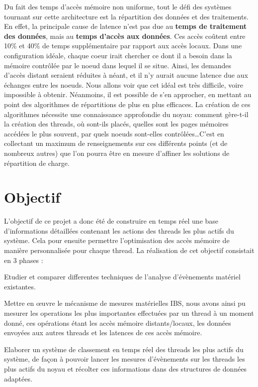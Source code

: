     Du fait des temps d'accès mémoire non uniforme, tout le défi des systèmes
    tournant sur cette architecture est la répartition des données et des
    traitements. En effet, la principale cause de latence n'est pas due au
    \textbf{temps de traitement des données}, mais au \textbf{temps d'accès aux
      données}. Ces accès coûtent entre 10\% et 40\% de temps supplémentaire par
    rapport aux accès locaux.\cite{Lepers2014} Dans une configuration idéale,
    chaque coeur irait chercher ce dont il a besoin dans la mémoire contrôlée
    par le noeud dans lequel il se situe. Ainsi, les demandes d'accès distant
    seraient réduites à néant, et il n'y aurait aucune latence due aux échanges
    entre les noeuds. Nous allons voir que cet idéal est très difficile, voire
    impossible à obtenir. Néanmoins, il est possible de s'en approcher, en
    mettant au point des algorithmes de répartitions de plus en plus
    efficaces. La création de ces algorithmes nécessite une connaissance
    approfondie du noyau: comment gère-t-il la création des threads, où sont-ils
    placés, quelles sont les pages mémoires accédées le plus souvent, par quels
    noeuds sont-elles contrôlées\ldots C'est en collectant un maximum de
    renseignements sur ces différents points (et de nombreux autres) que l'on
    pourra être en mesure d'affiner les solutions de répartition de charge.

    \section{Objectif}
      L'objectif de ce projet a donc été de construire en temps réel une base
      d'informations détaillées contenant les actions des threads les plus
      actifs du système. Cela pour ensuite permettre l'optimisation des accès
      mémoire de manière personnalisée pour chaque thread. La réalisation de cet
      objectif consistait en 3 phases : 

      \bitem
        \item{Etudier et comparer differentes techniques de l'analyse
          d'évènements matériel existantes.}
        \item{Mettre en \oe uvre le mécanisme de mesures matérielles IBS, nous
          avons ainsi pu mesurer les operations les plus importantes effectuées
          par un thread à un moment donné, ces opérations étant les accès
          mémoire distants/locaux, les données envoyées aux autres threads et
          les latences de ces accès mémoire.}
        \item{Elaborer un système de classement en temps réel des threads les
          plus actifs du système, de façon à pouvoir lancer les mesures
          d'évènements sur les threads les plus actifs du noyau et récolter ces
          informations dans des structures de données adaptées.}
      \eitem

